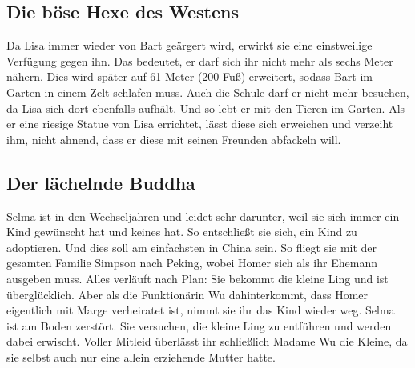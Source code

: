 \subsection{Die böse Hexe des Westens}\label{GABF05}
Da Lisa immer wieder von Bart geärgert wird, erwirkt sie eine einstweilige Verfügung gegen ihn. Das bedeutet, er darf sich ihr nicht mehr als sechs Meter nähern. Dies wird später auf 61 Meter (200 Fuß) erweitert, sodass Bart im Garten in einem Zelt schlafen muss. Auch die Schule darf er nicht mehr besuchen, da Lisa sich dort ebenfalls aufhält. Und so lebt er mit den Tieren im Garten. Als er eine riesige Statue von Lisa errichtet, lässt diese sich erweichen und verzeiht ihm, nicht ahnend, dass er diese mit seinen Freunden abfackeln will.


\subsection{Der lächelnde Buddha}\label{GABF06}
Selma ist in den Wechseljahren und leidet sehr darunter, weil sie sich immer ein Kind gewünscht hat und keines hat. So entschließt sie sich, ein Kind zu adoptieren. Und dies soll am einfachsten in China sein. So fliegt sie mit der gesamten Familie Simpson nach Peking, wobei Homer sich als ihr Ehemann ausgeben muss. Alles verläuft nach Plan: Sie bekommt die kleine Ling und ist überglücklich. Aber als die Funktionärin Wu dahinterkommt, dass Homer eigentlich mit Marge verheiratet ist, nimmt sie ihr das Kind wieder weg. Selma ist am Boden zerstört. Sie versuchen, die kleine Ling zu entführen und werden dabei erwischt. Voller Mitleid überlässt ihr schließlich Madame Wu die Kleine, da sie selbst auch nur eine allein erziehende Mutter hatte.


